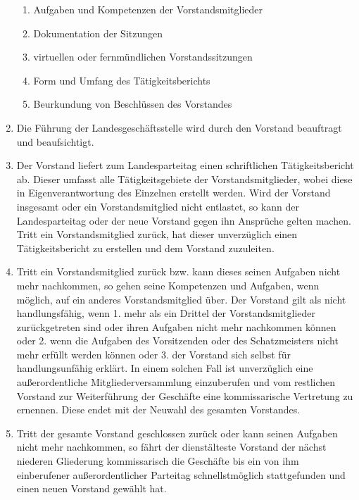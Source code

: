 \begin{enumerate}
\begin{enumerate}
\item Aufgaben und Kompetenzen der Vorstandsmitglieder

\item Dokumentation der Sitzungen

\item virtuellen oder fernmündlichen Vorstandssitzungen

\item Form und Umfang des Tätigkeitsberichts

\item Beurkundung von Beschlüssen des Vorstandes
\end{enumerate}

\item Die Führung der Landesgeschäftsstelle wird durch den Vorstand beauftragt
und beaufsichtigt.

\item Der Vorstand liefert zum Landesparteitag einen schriftlichen
Tätigkeitsbericht ab. Dieser umfasst alle Tätigkeitsgebiete der
Vorstandsmitglieder, wobei diese in Eigenverantwortung des Einzelnen erstellt
werden. Wird der Vorstand insgesamt oder ein Vorstandsmitglied nicht entlastet,
so kann der Landesparteitag oder der neue Vorstand gegen ihn Ansprüche gelten
machen. Tritt ein Vorstandsmitglied zurück, hat dieser unverzüglich einen
Tätigkeitsbericht zu erstellen und dem Vorstand zuzuleiten.

\item Tritt ein Vorstandsmitglied zurück bzw. kann dieses seinen Aufgaben nicht
mehr nachkommen, so gehen seine Kompetenzen und Aufgaben, wenn möglich, auf ein
anderes Vorstandsmitglied über.
Der Vorstand gilt als nicht handlungsfähig, wenn 1. mehr als ein Drittel der
Vorstandsmitglieder zurückgetreten sind oder ihren Aufgaben nicht mehr
nachkommen können oder 2. wenn die Aufgaben des Vorsitzenden oder des
Schatzmeisters nicht mehr erfüllt werden können oder 3. der Vorstand sich selbst
für handlungsunfähig erklärt.
In einem solchen Fall ist unverzüglich eine außerordentliche
Mitgliederversammlung einzuberufen und vom restlichen Vorstand zur Weiterführung
der Geschäfte eine kommissarische Vertretung zu ernennen. Diese endet mit der
Neuwahl des gesamten Vorstandes.

\item Tritt der gesamte Vorstand geschlossen zurück oder kann seinen Aufgaben
nicht mehr nachkommen, so fährt der dienstälteste Vorstand der nächst niederen
Gliederung kommissarisch die Geschäfte bis ein von ihm einberufener
außerordentlicher Parteitag schnellstmöglich stattgefunden und einen neuen
Vorstand gewählt hat.
\end{enumerate}


